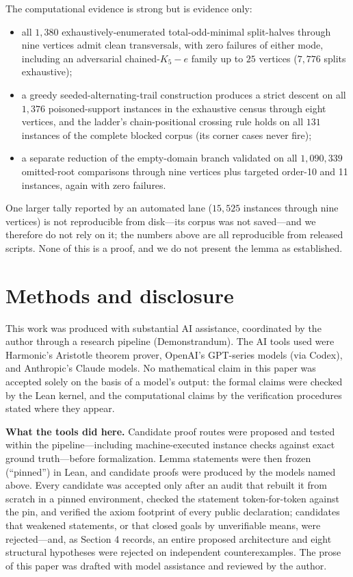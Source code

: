 \documentclass[11pt]{article}
\theoremstyle{definition}
\theoremstyle{remark}
\providecommand{\tightlist}{\setlength{\itemsep}{0pt}\setlength{\parskip}{0pt}}
\begin{document}
The computational evidence is strong but is evidence only:
\begin{itemize}
\tightlist
\item all $1{,}380$ exhaustively-enumerated total-odd-minimal split-halves through nine vertices admit clean transversals, with zero failures of either mode, including an adversarial chained-$K_5{-}e$ family up to $25$ vertices ($7{,}776$ splits exhaustive);
\item a greedy seeded-alternating-trail construction produces a strict descent on all $1{,}376$ poisoned-support instances in the exhaustive census through eight vertices, and the ladder's chain-positional crossing rule holds on all $131$ instances of the complete blocked corpus (its corner cases never fire);
\item a separate reduction of the empty-domain branch validated on all $1{,}090{,}339$ omitted-root comparisons through nine vertices plus targeted order-10 and 11 instances, again with zero failures.
\end{itemize}
One larger tally reported by an automated lane ($15{,}525$ instances through nine vertices) is not reproducible from disk---its corpus was not saved---and we therefore do not rely on it; the numbers above are all reproducible from released scripts. None of this is a proof, and we do not present the lemma as established.

\section{Methods and disclosure}\label{6-methods-and-disclosure}

This work was produced with substantial AI assistance, coordinated by the author through a research pipeline (Demonstrandum). The AI tools used were Harmonic's Aristotle theorem prover, OpenAI's GPT-series models (via Codex), and Anthropic's Claude models. No mathematical claim in this paper was accepted solely on the basis of a model's output: the formal claims were checked by the Lean kernel, and the computational claims by the verification procedures stated where they appear.

\textbf{What the tools did here.} Candidate proof routes were proposed and tested within the pipeline---including machine-executed instance checks against exact ground truth---before formalization. Lemma statements were then frozen (``pinned'') in Lean, and candidate proofs were produced by the models named above. Every candidate was accepted only after an audit that rebuilt it from scratch in a pinned environment, checked the statement token-for-token against the pin, and verified the axiom footprint of every public declaration; candidates that weakened statements, or that closed goals by unverifiable means, were rejected---and, as Section 4 records, an entire proposed architecture and eight structural hypotheses were rejected on independent counterexamples. The prose of this paper was drafted with model assistance and reviewed by the author.
\end{document}

